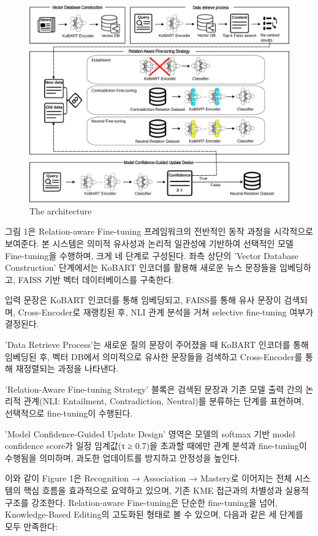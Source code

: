 \documentclass[a4paper,fleqn]{cas-sc}
\begin{document}
\begin{figure}[htbp]
    \centering
    \includegraphics[width=\textwidth]{architecture.png}
    \caption{The architecture }
\end{figure}

그림 1은 Relation-aware Fine-tuning 프레임워크의 전반적인 동작 과정을 시각적으로 보여준다. 본 시스템은 의미적 유사성과 논리적 일관성에 기반하여 선택적인 모델 Fine-tuning을 수행하며, 크게 네 단계로 구성된다.
좌측 상단의 'Vector Database Construction' 단계에서는 KoBART 인코더를 활용해 새로운 뉴스 문장들을 임베딩하고, FAISS 기반 벡터 데이터베이스를 구축한다.

입력 문장은 KoBART 인코더를 통해 임베딩되고, FAISS를 통해 유사 문장이 검색되며, Cross-Encoder로 재랭킹된 후, NLI 관계 분석을 거쳐 selective fine-tuning 여부가 결정된다.

'Data Retrieve Process'는 새로운 질의 문장이 주어졌을 때 KoBART 인코더를 통해 임베딩된 후, 벡터 DB에서 의미적으로 유사한 문장들을 검색하고 Cross-Encoder를 통해 재정렬되는 과정을 나타낸다.

'Relation-Aware Fine-tuning Strategy' 블록은 검색된 문장과 기존 모델 출력 간의 논리적 관계(NLI: Entailment, Contradiction, Neutral)를 분류하는 단계를 표현하며, 선택적으로 fine-tuning이 수행된다.

'Model Confidence-Guided Update Design' 영역은 모델의 softmax 기반 model confidence score가 일정 임계값(τ ≥ 0.7)을 초과할 때에만 관계 분석과 fine-tuning이 수행됨을 의미하며, 과도한 업데이트를 방지하고 안정성을 높인다.

이와 같이 Figure 1은 Recognition → Association → Mastery로 이어지는 전체 시스템의 핵심 흐름을 효과적으로 요약하고 있으며, 기존 KME 접근과의 차별성과 실용적 구조를 강조한다. 
Relation-aware Fine-tuning은 단순한 fine-tuning을 넘어, Knowledge-Based Editing의 고도화된 형태로 볼 수 있으며, 다음과 같은 세 단계를 모두 만족한다:
\end{document}

